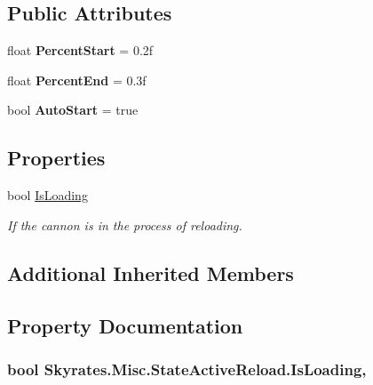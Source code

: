 \subsection*{Public Attributes}
\begin{DoxyCompactItemize}
\item 
\hypertarget{class_skyrates_1_1_misc_1_1_state_active_reload_a29da13bb99b03a8bd17d2a9c2904bb92}{float {\bfseries Percent\-Start} = 0.\-2f}\label{class_skyrates_1_1_misc_1_1_state_active_reload_a29da13bb99b03a8bd17d2a9c2904bb92}

\item 
\hypertarget{class_skyrates_1_1_misc_1_1_state_active_reload_a9404369eee4ad0ec9bc1722158691f58}{float {\bfseries Percent\-End} = 0.\-3f}\label{class_skyrates_1_1_misc_1_1_state_active_reload_a9404369eee4ad0ec9bc1722158691f58}

\item 
\hypertarget{class_skyrates_1_1_misc_1_1_state_active_reload_a8c58eca73c93ffe1ba0e2ef3e0242a2f}{bool {\bfseries Auto\-Start} = true}\label{class_skyrates_1_1_misc_1_1_state_active_reload_a8c58eca73c93ffe1ba0e2ef3e0242a2f}

\end{DoxyCompactItemize}
\subsection*{Properties}
\begin{DoxyCompactItemize}
\item 
bool \hyperlink{class_skyrates_1_1_misc_1_1_state_active_reload_a09cc8e5f1d0601ab3649537ffc802d13}{Is\-Loading}
\begin{DoxyCompactList}\small\item\em If the cannon is in the process of reloading. \end{DoxyCompactList}\end{DoxyCompactItemize}
\subsection*{Additional Inherited Members}


\subsection{Property Documentation}
\hypertarget{class_skyrates_1_1_misc_1_1_state_active_reload_a09cc8e5f1d0601ab3649537ffc802d13}{
\subsubsection[{Is\-Loading}]{\setlength{\rightskip}{0pt plus 5cm}bool Skyrates.\-Misc.\-State\-Active\-Reload.\-Is\-Loading\hspace{0.3cm}{\ttfamily [get]}, {\ttfamily [set]}}}\label{class_skyrates_1_1_misc_1_1_state_active_reload_a09cc8e5f1d0601ab3649537ffc802d13}


